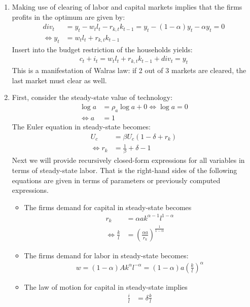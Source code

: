 \begin{enumerate}
\item Making use of clearing of labor and capital markets implies that the firms profits in the optimum are given by:
\begin{align*}
{div}_t &= y_t - w_t l_{t} - r_{k,t} k_{t-1} = y_t - (1-\alpha)y_t - \alpha y_t = 0
\\
\Leftrightarrow y_t &= w_t l_{t} + r_{k,t} k_{t-1}
\end{align*}
Insert into the budget restriction of the households yields:
\begin{align*}
c_t + i_t = w_t l_{t} + r_{k,t} k_{t-1} + {div}_t = y_t
\end{align*}
This is a manifestation of Walras law: if 2 out of 3 markets are cleared, the last market must clear as well.

\item First, consider the steady-state value of technology:
\begin{align*}
\log{a}&=\rho_a \log{a} + 0 \Leftrightarrow \log{a} = 0
\\
\Leftrightarrow a &= 1 
\end{align*}
The Euler equation in steady-state becomes:
\begin{align*}
U_c &= \beta U_c (1-\delta+r_k)
\\
\Leftrightarrow r_k &= \frac{1}{\beta} + \delta - 1
\end{align*}
Next we will provide recursively closed-form expressions for all variables in terms of steady-state labor.
That is the right-hand sides of the following equations are given in terms of parameters or previously computed expressions.
\begin{itemize}
	\item The firms demand for capital in steady-state becomes
	\begin{align*}
	r_k &= \alpha a k^{\alpha-1} l^{1-\alpha}
	\\
	\Leftrightarrow \frac{k}{l} &= \left(\frac{\alpha a}{r_k}\right)^{\frac{1}{1-\alpha}}
	\end{align*}
	\item The firms demand for labor in steady-state becomes:
	\begin{align*}
	w = (1-\alpha) A k^\alpha l^{-\alpha} = (1-\alpha)a \left(\frac{k}{l}\right)^\alpha
	\end{align*}
	\item The law of motion for capital in steady-state implies
	\begin{align*}
	\frac{i}{l} &= \delta\frac{k}{l}
	\end{align*}

\end{itemize}
\end{enumerate}
